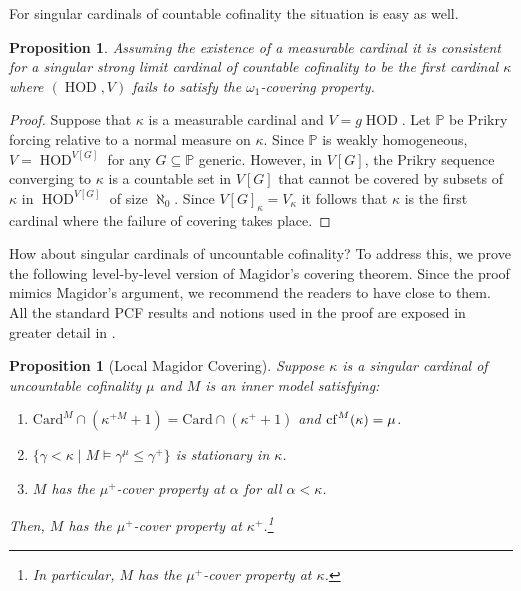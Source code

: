 \documentclass[11pt]{amsart}
\newtheorem{proposition}[theorem]{Proposition}
\theoremstyle{definition}
\theoremstyle{remark}
\DeclareMathOperator{\HOD}{HOD}
\newcommand{\cf}{{\rm cf}}
\def\s{\subseteq}
\newcommand\ale[1]{\marginpar{Alejandro: #1}}
\begin{document}
For singular cardinals of countable cofinality the situation is easy as well.
\begin{proposition}
 Assuming the existence of a measurable cardinal it is consistent for a singular strong limit cardinal of countable cofinality to be the first cardinal $\kappa$ where $(\HOD, V)$ fails to satisfy the $\omega_1$-covering property.
\end{proposition}
\begin{proof}
Suppose that $\kappa$ is a measurable cardinal and $V=g\HOD$. Let $\mathbb{P}$ be Prikry forcing relative to a normal measure on $\kappa$. Since $\mathbb{P}$ is weakly homogeneous, $V=\HOD^{V[G]}$ for any $G\s \mathbb{P}$ generic. However, in $V[G]$, the Prikry sequence converging to $\kappa$ is a countable set in $V[G]$ that cannot be covered by subsets of $\kappa$ in $\HOD^{V[G]}$  of size $\aleph_0$. Since $V[G]_\kappa = V_\kappa$ it follows that $\kappa$ is the first cardinal where the failure of covering takes place.
\end{proof}
How about singular cardinals of uncountable cofinality? To address this, we prove the following level-by-level version of Magidor's covering theorem. Since the proof mimics Magidor's argument, we recommend the readers to have \cite[Theorem~2.33]{AbrahamMagidor} close to them.   All the standard PCF results and notions used in the proof are exposed in greater detail in \cite[\S2]{AbrahamMagidor}.
\begin{proposition}
    [Local Magidor Covering]\label{lemma: local Magidor}
    Suppose \(\kappa\) is a singular cardinal of uncountable cofinality \(\mu\) and  \(M\) is an inner model satisfying:
    \begin{enumerate}
        \item\label{clause: cardinalcorrectness} $ \mathrm{Card}^M\cap (\kappa^{+M}+1)=\mathrm{Card}\cap (\kappa^++1)$ and {$\cf^M(\kappa)=\mu$}.%
        \item\label{clause: GCH} $\{\gamma<\kappa\mid M\models \gamma^\mu\leq \gamma^+\}$ is stationary in $\kappa$.
        \item\label{clause: coverbelow}  $M$ has the $\mu^+$-cover property at $\alpha$ for all $\alpha < \kappa$.    \end{enumerate}
    Then,  \(M\) has the \(\mu^+\)-cover property at \(\kappa^+\).\footnote{In particular, $M$ has the $\mu^+$-cover property at $\kappa$.}
\end{proposition}
\end{document}
